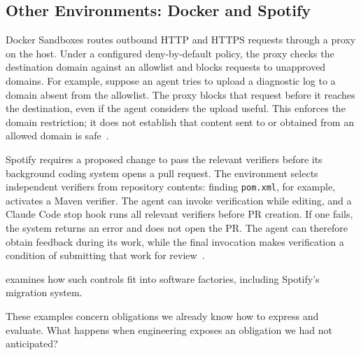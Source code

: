 \subsection{Other Environments: Docker and Spotify}\label{heading:example-docker}

Docker Sandboxes routes outbound HTTP and HTTPS requests through a proxy on the host. Under a configured deny-by-default policy, the proxy checks the destination domain against an allowlist and blocks requests to unapproved domains. For example, suppose an agent tries to upload a diagnostic log to a domain absent from the allowlist. The proxy blocks that request before it reaches the destination, even if the agent considers the upload useful. This enforces the domain restriction; it does not establish that content sent to or obtained from an allowed domain is safe~\citep{mikhalev2026untrusted}.

Spotify requires a proposed change to pass the relevant verifiers before its background coding system opens a pull request. The environment selects independent verifiers from repository contents: finding \texttt{pom.xml}, for example, activates a Maven verifier. The agent can invoke verification while editing, and a Claude Code stop hook runs all relevant verifiers before PR creation. If one fails, the system returns an error and does not open the PR. The agent can therefore obtain feedback during its work, while the final invocation makes verification a condition of submitting that work for review~\citep{charas2025feedback}.

 examines how such controls fit into software factories, including Spotify's migration system.


These examples concern obligations we already know how to express and evaluate. What happens when engineering exposes an obligation we had not anticipated?
